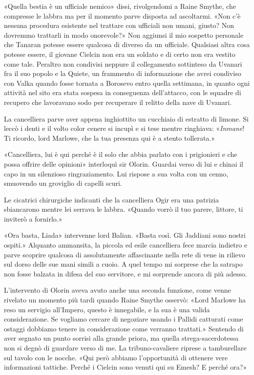 «Quella bestia è un ufficiale nemico» dissi, rivolgendomi a Raine
Smythe, che compresse le labbra ma per il momento parve disposta ad
ascoltarmi. «Non c'è nessuna procedura esistente nel trattare con
ufficiali non umani, giusto? Non dovremmo trattarli in modo onorevole?»
Non aggiunsi il mio sospetto personale che Tanaran potesse essere
qualcosa di diverso da un ufficiale. Qualsiasi altra cosa potesse
essere, il giovane Cielcin non era un soldato e di certo non era vestito
come tale. Peraltro non condivisi neppure il collegamento sottinteso da
Uvanari fra il suo popolo e la Quiete, un frammento di informazione che
avrei condiviso con Valka quando fosse tornata a Borosevo entro quella
settimana, in quanto ogni attività nel sito era stata sospesa in
conseguenza dell'attacco, con le squadre di recupero che lavoravano sodo
per recuperare il relitto della nave di Uvanari.

La cancelliera parve aver appena inghiottito un cucchiaio di estratto di
limone. Si leccò i denti e il volto color cenere si incupì e si tese
mentre ringhiava: «\emph{Inmane}! Ti ricordo, lord Marlowe, che la tua
presenza qui è a stento tollerata.»

«Cancelliera, lui è qui perché è il solo che abbia parlato con i
prigionieri e che possa offrire delle opinioni» interloquì sir Olorin.
Guardai verso di lui e chinai il capo in un silenzioso ringraziamento.
Lui rispose a sua volta con un cenno, smuovendo un groviglio di capelli
scuri.

Le cicatrici chirurgiche indicanti che la cancelliera Ogir era una
patrizia sbiancarono mentre lei serrava le labbra. «Quando vorrò il tuo
parere, littore, ti inviterò a fornirlo.»

«Ora basta, Liada» intervenne lord Balian. «Basta così. Gli Jaddiani
sono nostri ospiti.» Alquanto ammansita, la piccola ed esile cancelliera
fece marcia indietro e parve scoprire qualcosa di assolutamente
affascinante nella rete di vene in rilievo sul dorso delle sue mani
simili a cuoio. A quel tempo mi sorprese che la satrapo non fosse
balzata in difesa del suo servitore, e mi sorprende ancora di più
adesso.

L'intervento di Olorin aveva avuto anche una seconda funzione, come
venne rivelato un momento più tardi quando Raine Smythe osservò: «Lord
Marlowe ha reso un servigio all'Impero, questo è innegabile, e la sua è
una valida considerazione. Se vogliamo cercare di negoziare usando i
Pallidi catturati come ostaggi dobbiamo tenere in considerazione come
verranno trattati.» Sentendo di aver segnato un punto sorrisi alla
grande priora, ma quella strega-sacerdotessa non si degnò di guardare
verso di me. La tribuno-cavaliere riprese a tamburellare sul tavolo con
le nocche. «Qui però abbiamo l'opportunità di ottenere vere informazioni
tattiche. Perché i Cielcin sono venuti qui su Emesh? E perché ora?»

